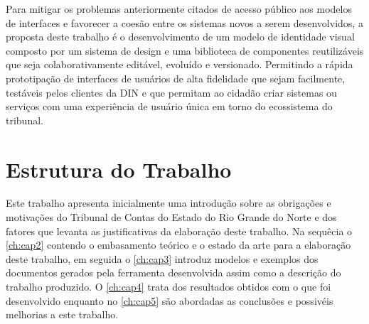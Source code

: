   Para mitigar os problemas anteriormente citados de acesso público aos modelos de interfaces e favorecer a coesão entre os sistemas novos a serem desenvolvidos, a proposta deste trabalho é o desenvolvimento de um modelo de identidade visual composto por um sistema de design e uma biblioteca de componentes reutilizáveis que seja colaborativamente editável, evoluído e versionado. Permitindo a rápida prototipação de interfaces de usuários de alta fidelidade que sejam facilmente, testáveis pelos clientes da DIN e que permitam ao cidadão criar sistemas ou serviços com uma experiência de usuário única em torno do ecossistema do tribunal.



  \section{Estrutura do Trabalho}
  Este trabalho apresenta inicialmente uma introdução sobre as obrigações e motivações do Tribunal de Contas do Estado do Rio Grande do Norte e dos fatores que levanta as justificativas da elaboração deste trabalho.
  Na sequêcia o \autoref{ch:cap2} contendo o embasamento teórico e o estado da arte para a elaboração deste trabalho, em seguida o \autoref{ch:cap3} introduz modelos e exemplos dos documentos gerados pela ferramenta desenvolvida assim como a descrição do trabalho produzido. O \autoref{ch:cap4} trata dos resultados obtidos com o que foi desenvolvido enquanto no \autoref{ch:cap5} são abordadas as conclusões e possivéis melhorias a este trabalho.
